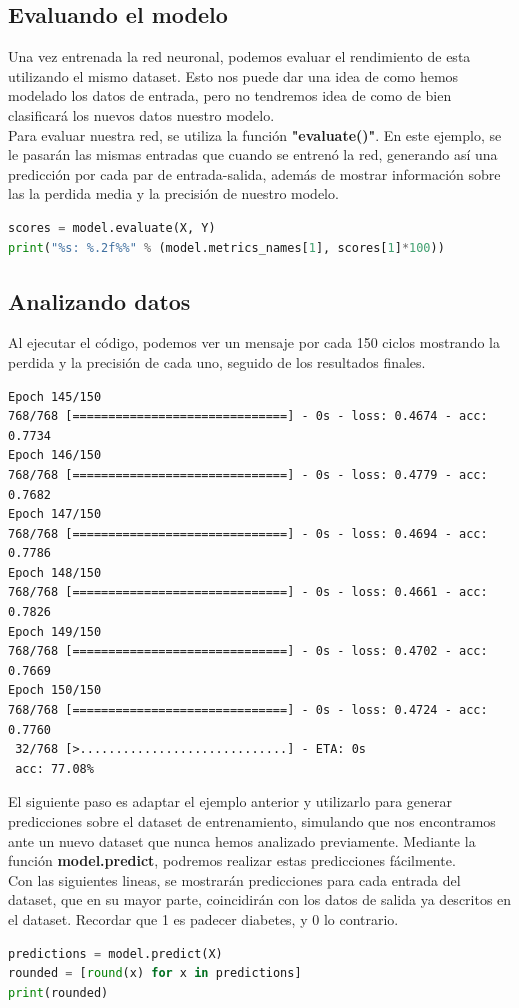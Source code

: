 \subsection{Evaluando el modelo}
Una vez entrenada la red neuronal, podemos evaluar el rendimiento de esta utilizando el mismo dataset. Esto nos puede dar una idea de como hemos modelado los datos de entrada, pero no tendremos idea de como de bien clasificará los nuevos datos nuestro modelo.\\
Para evaluar nuestra red, se utiliza la función \textbf{"evaluate()"}. En este ejemplo, se le pasarán las mismas entradas que cuando se entrenó la red, generando así una predicción por cada par de entrada-salida, además de mostrar información sobre las la perdida media y la precisión de nuestro modelo.
\begin{lstlisting}[language=Python]
scores = model.evaluate(X, Y)
print("%s: %.2f%%" % (model.metrics_names[1], scores[1]*100))
\end{lstlisting}

\subsection{Analizando datos}
Al ejecutar el código, podemos ver un mensaje por cada 150 ciclos mostrando la perdida y la precisión de cada uno, seguido de los resultados finales.
\begin{verbatim}
Epoch 145/150
768/768 [==============================] - 0s - loss: 0.4674 - acc: 0.7734
Epoch 146/150
768/768 [==============================] - 0s - loss: 0.4779 - acc: 0.7682
Epoch 147/150
768/768 [==============================] - 0s - loss: 0.4694 - acc: 0.7786
Epoch 148/150
768/768 [==============================] - 0s - loss: 0.4661 - acc: 0.7826
Epoch 149/150
768/768 [==============================] - 0s - loss: 0.4702 - acc: 0.7669
Epoch 150/150
768/768 [==============================] - 0s - loss: 0.4724 - acc: 0.7760
 32/768 [>.............................] - ETA: 0s
 acc: 77.08%
 \end{verbatim}
El siguiente paso es adaptar el ejemplo anterior y utilizarlo para generar predicciones sobre el dataset de entrenamiento, simulando que nos encontramos ante un nuevo dataset que nunca hemos analizado previamente. Mediante la función \textbf{model.predict}, podremos realizar estas predicciones fácilmente.\\
Con las siguientes lineas, se mostrarán predicciones para cada entrada del dataset, que en su mayor parte, coincidirán con los datos de salida ya descritos en el dataset. Recordar que 1 es padecer diabetes, y 0 lo contrario.
\begin{lstlisting}[language=Python]
predictions = model.predict(X)
rounded = [round(x) for x in predictions]
print(rounded)
\end{lstlisting}


